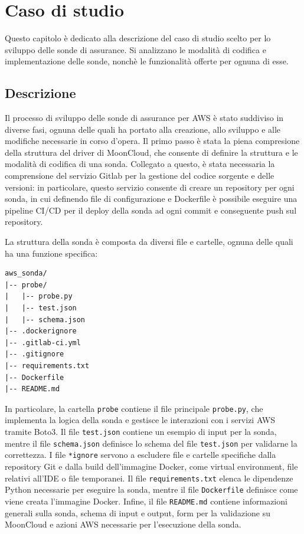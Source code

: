 \chapter{Caso di studio}
\label{cap:caso_studio}

Questo capitolo è dedicato alla descrizione del caso di studio scelto per lo sviluppo delle sonde di assurance. Si analizzano le modalità di codifica e implementazione delle sonde, nonchè le funzionalità offerte per ognuna di esse.

\section{Descrizione}
\label{sec:descrizione}

Il processo di sviluppo delle sonde di assurance per AWS è stato suddiviso in diverse fasi, ognuna delle quali ha portato alla creazione, allo sviluppo e alle modifiche necessarie in corso d'opera. Il primo passo è stata la piena compresione della struttura del driver di MoonCloud, che consente di definire la struttura e le modalità di codifica di una sonda. Collegato a questo, è stata necessaria la comprensione del servizio Gitlab per la gestione del codice sorgente e delle versioni: in particolare, questo servizio consente di creare un repository per ogni sonda, in cui definendo file di configurazione e Dockerfile è possibile eseguire una pipeline CI/CD per il deploy della sonda ad ogni commit e conseguente push sul repository.

La struttura della sonda è composta da diversi file e cartelle, ognuna delle quali ha una funzione specifica:

\begin{lstlisting}[caption={Struttura di ogni sonda per MoonCloud}]
aws_sonda/
|-- probe/
|   |-- probe.py
|   |-- test.json
|   |-- schema.json
|-- .dockerignore
|-- .gitlab-ci.yml
|-- .gitignore  
|-- requirements.txt
|-- Dockerfile
|-- README.md
\end{lstlisting}

In particolare, la cartella \texttt{probe} contiene il file principale \texttt{probe.py}, che implementa la logica della sonda e gestisce le interazioni con i servizi AWS tramite Boto3. Il file \texttt{test.json} contiene un esempio di input per la sonda, mentre il file \texttt{schema.json} definisce lo schema del file \texttt{test.json} per validarne la correttezza. I file \texttt{*ignore} servono a escludere file e cartelle specifiche dalla repository Git e dalla build dell'immagine Docker, come virtual environment, file relativi all'IDE o file temporanei. Il file \texttt{requirements.txt} elenca le dipendenze Python necessarie per eseguire la sonda, mentre il file \texttt{Dockerfile} definisce come viene creata l'immagine Docker. Infine, il file \texttt{README.md} contiene informazioni generali sulla sonda, schema di input e output, form per la validazione su MoonCloud e azioni AWS necessarie per l'esecuzione della sonda.

